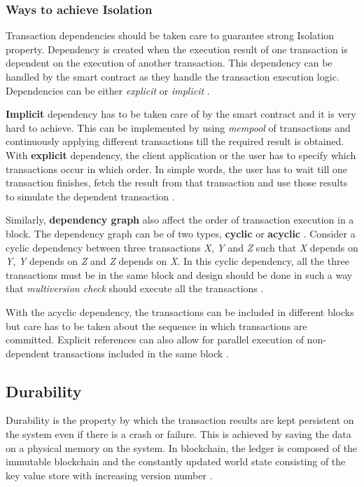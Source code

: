 \documentclass[
  a4paper,  %
  twoside,  %
  bibliography=totoc,
  headsepline,
  cleardoublepage=empty,
  parskip=half,
  draft=false
]{scrbook}
\begin{document}
\subsubsection{Ways to achieve Isolation}
Transaction dependencies should be taken care to guarantee strong Isolation property. Dependency is created when the execution result of one transaction is dependent on the execution of another transaction. This dependency can be handled by the smart contract as they handle the transaction execution logic. Dependencies can be either \textit{explicit} or \textit{implicit} \cite{HW2}. 

\textbf{Implicit} dependency has to be taken care of by the smart contract and it is very hard to achieve. This can be implemented by using \textit{mempool} of transactions and continuously applying different transactions till the required result is obtained. With \textbf{explicit} dependency, the client application or the user has to specify which transactions occur in which order. In simple words, the user has to wait till one transaction finishes, fetch the result from that transaction and use those results to simulate the dependent transaction \cite{HW2}.

Similarly, \textbf{dependency graph} also affect the order of transaction execution in a block. The dependency graph can be of two types, \textbf{cyclic} or \textbf{acyclic} \cite{HW2}. Consider a cyclic dependency between three transactions \textit{X}, \textit{Y} and \textit{Z} such that \textit{X} depends on \textit{Y}, \textit{Y} depends on \textit{Z} and \textit{Z} depends on \textit{X}. In this cyclic dependency, all the three transactions must be in the same block and design should be done in such a way that \textit{multiversion check} should execute all the transactions \cite{HW2}.

With the acyclic dependency, the transactions can be included in different blocks but care has to be taken about the sequence in which transactions are committed. Explicit references can also allow for parallel execution of non-dependent transactions included in the same block \cite{HW2}.

\subsection{Durability}
Durability is the property by which the transaction results are kept persistent on the system even if there is a crash or failure. This is achieved by saving the data on a physical memory on the system. In blockchain, the ledger is composed of the immutable blockchain and the constantly updated world state consisting of the key value store with increasing version number \cite{Ledger}. 
\end{document}
